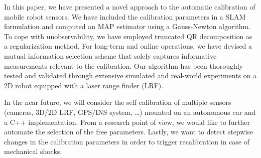 In this paper, we have presented a novel approach to the automatic calibration
of mobile robot sensors. We have included the calibration parameters in a SLAM
formulation and computed an MAP estimator using a Gauss-Newton algorithm. To
cope with unobservability, we have employed truncated QR decomposition as a
regularization method. For long-term and online operations, we have devised
a mutual information selection scheme that solely captures informative
measurements relevant to the calibration. Our algorithm has been thoroughly
tested and validated through extensive simulated and real-world experiments on
a 2D robot equipped with a laser range finder (LRF).

In the near future, we will consider the self calibration of multiple sensors
(cameras, 3D/2D LRF, GPS/INS system, \dots) mounted on an autonomous car and a C++
implementation. From a research point of view, we would like to further automate
the selection of the free parameters. Lastly, we want to detect stepwise changes
in the calibration parameters in order to trigger recalibration in case of
mechanical shocks.
